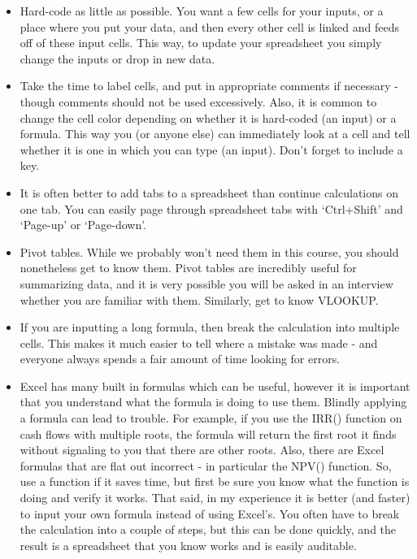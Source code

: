 \documentclass{article}
\begin{document}
\begin{itemize}
 \item Hard-code as little as possible.  You want a few cells for your inputs, or a place where you put your data, and then every other cell is linked and feeds off of these input cells. This way, to update your spreadsheet you simply change the inputs or drop in new data.  
\item Take the time to label cells, and put in appropriate comments if necessary  - though comments should not be used excessively. Also, it is common to change the cell color depending on whether it is hard-coded (an input) or a formula.  This way you (or anyone else) can immediately look at a cell and tell whether it is one in which you can type (an input).  Don't forget to include a key.
\item It is often better to add tabs to a spreadsheet than continue calculations on one tab.  You can easily page through spreadsheet tabs with `Ctrl+Shift' and `Page-up' or `Page-down'.  
\item Pivot tables.  While we probably won't need them in this course, you should nonetheless get to know them.  Pivot tables are incredibly useful for summarizing data, and it is very possible you will be asked in an interview whether you are familiar with them.  Similarly, get to know VLOOKUP.
\item  If you are inputting a long formula, then break the calculation into multiple cells.  This makes it much easier to tell where a mistake was made - and everyone always spends a fair amount of time looking for errors. 
\item Excel has many built in formulas which can be useful, however it is important that you understand what the formula is doing to use them.  Blindly applying a formula can lead to trouble.  For example, if you use the IRR() function on cash flows with multiple roots, the formula will return the first root it finds without signaling to you that there are other roots.  Also, there are Excel formulas that are flat out incorrect - in particular the NPV() function.  So, use a function if it saves time, but first be sure you know what the function is doing and verify it works.  That said, in my experience it is better (and faster) to input your own formula instead of using Excel's.  You often have to break the calculation into a couple of steps, but this can be done quickly, and the result is a spreadsheet that you know works and is easily auditable. 
\end{itemize}
\end{document}
